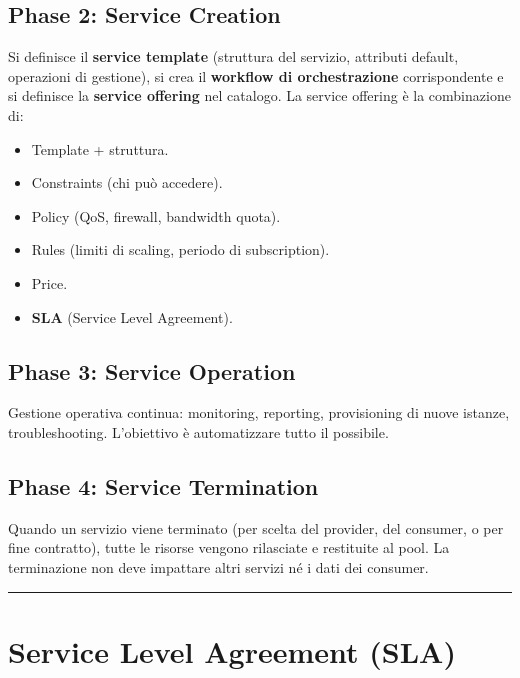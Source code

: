 \documentclass[
  italian,
  openany]{book}
\providecommand{\tightlist}{%
  \setlength{\itemsep}{0pt}\setlength{\parskip}{0pt}}
\begin{document}
\subsection{Phase 2: Service Creation}\label{phase-2-service-creation}

Si definisce il \textbf{service template} (struttura del servizio,
attributi default, operazioni di gestione), si crea il \textbf{workflow
di orchestrazione} corrispondente e si definisce la \textbf{service
offering} nel catalogo. La service offering è la combinazione di:

\begin{itemize}
\tightlist
\item
  Template + struttura.
\item
  Constraints (chi può accedere).
\item
  Policy (QoS, firewall, bandwidth quota).
\item
  Rules (limiti di scaling, periodo di subscription).
\item
  Price.
\item
  \textbf{SLA} (Service Level Agreement).
\end{itemize}

\subsection{Phase 3: Service Operation}\label{phase-3-service-operation}

Gestione operativa continua: monitoring, reporting, provisioning di
nuove istanze, troubleshooting. L'obiettivo è automatizzare tutto il
possibile.

\subsection{Phase 4: Service
Termination}\label{phase-4-service-termination}

Quando un servizio viene terminato (per scelta del provider, del
consumer, o per fine contratto), tutte le risorse vengono rilasciate e
restituite al pool. La terminazione non deve impattare altri servizi né
i dati dei consumer.

\begin{center}\rule{0.5\linewidth}{0.5pt}\end{center}

\section{Service Level Agreement
(SLA)}\label{service-level-agreement-sla-1}
\end{document}
